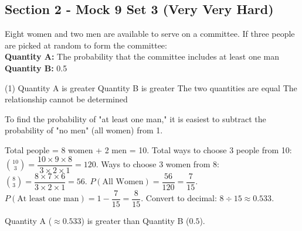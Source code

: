 \documentclass[11pt,paper=a4,answers]{exam}
\begin{document}
\begin{questions}
\pointsinrightmargin
\pointsdroppedatright
\marksnotpoints
{}
\pointformat{\boldmath\themarginpoints}
\bracketedpoints


\section*{Section 2 - Mock 9 Set 3 (Very Very Hard)}


\question
Eight women and two men are available to serve on a committee. If three people are picked at random to form the committee:
\vspace{5pt}\\
\textbf{Quantity A: } The probability that the committee includes at least one man \\
\vspace{5pt}
\textbf{Quantity B: } 0.5

\begin{tasks}(1)
\task[A)] Quantity A is greater
\task[B)] Quantity B is greater
\task[C)] The two quantities are equal
\task[D)] The relationship cannot be determined
\end{tasks}

\begin{solution}
To find the probability of "at least one man," it is easiest to subtract the probability of "no men" (all women) from 1.
\vspace{5pt}
\begin{center}
Total people = 8 women + 2 men = 10.
\vspace{5pt}
Total ways to choose 3 people from 10: 
\vspace{5pt}
$\binom{10}{3} = \dfrac{10 \times 9 \times 8}{3 \times 2 \times 1} = 120$.
\vspace{10pt}
Ways to choose 3 women from 8:
\vspace{5pt}
$\binom{8}{3} = \dfrac{8 \times 7 \times 6}{3 \times 2 \times 1} = 56$.
\vspace{10pt}
$P(\text{All Women}) = \dfrac{56}{120} = \dfrac{7}{15}$.
\vspace{10pt}
$P(\text{At least one man}) = 1 - \dfrac{7}{15} = \dfrac{8}{15}$.
\vspace{5pt}
Convert to decimal: $8 \div 15 \approx 0.533$.
\end{center}
\vspace{5pt}
Quantity A ($\approx 0.533$) is greater than Quantity B ($0.5$).


\end{solution}
\end{questions}
\end{document}
